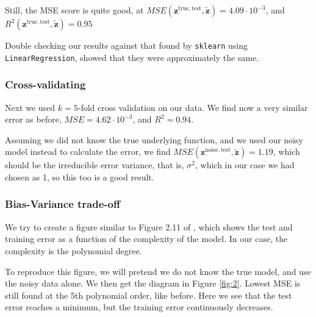 \documentclass[a4paper,10pt,english]{article}
\def\code#1{\texttt{#1}} %
\begin{document}
Still, the MSE score is quite good, at $MSE(\bm{z}^\mathrm{true,test}, \bm{\tilde z})=4.09\cdot 10 ^{-3}$, and $R^2(\bm{z}^\mathrm{true,test}, \bm{\tilde z})=0.95$

Double checking our results against that found by \code{sklearn} using \code{LinearRegression}, showed that they were approximately the same.

\subsubsection{Cross-validating}
Next we used $k=5$-fold cross validation on our data.
We find now a very similar error as before, $MSE = 4.62\cdot 10^{-3}$, and $R^2= 0.94$.

Assuming we did not know the true underlying function, and we used our noisy model instead to calculate the error, we find
$MSE(\bm{z}^\mathrm{noise,test}, \bm{\tilde z}) = 1.19$,
which should be the irreducible error variance, that is, $\sigma^2$, which in our case we had chosen as 1, so this too is a good result.


\subsubsection{ Bias-Variance trade-off}
We try to create a figure similar to Figure 2.11 of \citet{Hastie2009}, which shows the test and training error as a function of the complexity of the model. In our case, the complexity is the polynomial degree.

To reproduce this figure, we will pretend we do not know the true model, and use the noisy data alone. We then get the diagram in Figure \ref{fig:2}. Lowest MSE is still found at the 5th polynomial order, like before. Here we see that the test error reaches a minimum, but the training error continuously decreases.
 
\end{document}
